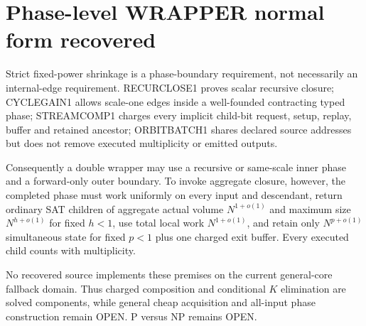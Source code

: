 \section{Phase-level WRAPPER normal form recovered}
Strict fixed-power shrinkage is a phase-boundary requirement, not necessarily
an internal-edge requirement.  RECURCLOSE1 proves scalar recursive closure;
CYCLEGAIN1 allows scale-one edges inside a well-founded contracting typed
phase; STREAMCOMP1 charges every implicit child-bit request, setup, replay,
buffer and retained ancestor; ORBITBATCH1 shares declared source addresses
but does not remove executed multiplicity or emitted outputs.

Consequently a double wrapper may use a recursive or same-scale inner phase
and a forward-only outer boundary.  To invoke aggregate closure, however, the
completed phase must work uniformly on every input and descendant, return
ordinary SAT children of aggregate actual volume $N^{1+o(1)}$ and maximum
size $N^{h+o(1)}$ for fixed $h<1$, use total local work $N^{1+o(1)}$, and
retain only $N^{p+o(1)}$ simultaneous state for fixed $p<1$ plus one charged
exit buffer.  Every executed child counts with multiplicity.

No recovered source implements these premises on the current general-core
fallback domain.  Thus charged composition and conditional $K$ elimination
are solved components, while general cheap acquisition and all-input phase
construction remain OPEN.  P versus NP remains OPEN.
